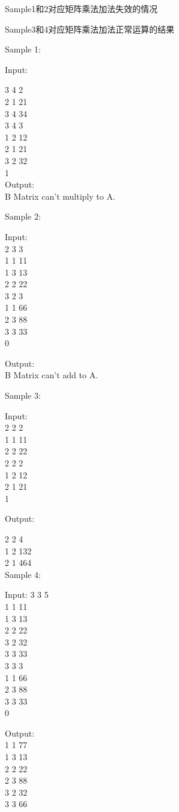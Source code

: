 Sample1和2对应矩阵乘法加法失效的情况

Sample3和4对应矩阵乘法加法正常运算的结果

Sample 1:

   Input:

   3 4 2\\
   2 1 21\\
   3 4 34\\
   3 4 3\\
   1 2 12\\
   2 1 21\\
   3 2 32\\
   1\\


   Output:\\
   B Matrix can't multiply to A.



Sample 2:

   Input:\\
   2 3 3\\
   1 1 11\\
   1 3 13\\
   2 2 22\\
   3 2 3\\
   1 1 66\\
   2 3 88\\
   3 3 33\\
   0


   Output:\\
   B Matrix can't add to A.


Sample 3:

   Input:\\
   2 2 2\\
   1 1 11\\
   2 2 22\\
   2 2 2\\
   1 2 12\\
   2 1 21\\
   1


   Output:

   2 2 4\\
   1 2 132\\
   2 1 464\\


Sample 4:

   Input:
   3 3 5\\
   1 1 11\\
   1 3 13\\
   2 2 22\\
   3 2 32\\
   3 3 33\\
   3 3 3\\
   1 1 66\\
   2 3 88\\
   3 3 33\\
   0


   Output:\\
   1 1 77\\
   1 3 13\\
   2 2 22\\
   2 3 88\\
   3 2 32\\
   3 3 66